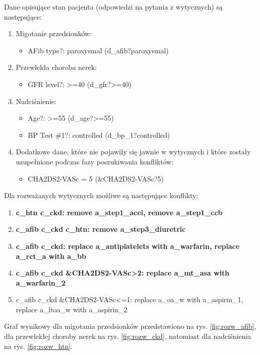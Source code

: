 Dane opisujące stan pacjenta (odpowiedzi na pytania z wytycznych) są następujące:
\begin{enumerate}
\item{Migotanie przedsionków:
	\begin{itemize}
	\item{AFib type?: paroxysmal (d\_afib?paroxysmal)}
	\end{itemize}
}
\item{Przewlekła choroba nerek:
	\begin{itemize}
	\item{GFR level?: >=40 (d\_gfr?>=40)}
	\end{itemize}
}
\item{Nadciśnienie:
	\begin{itemize}
	\item{Age?: >=55 (d\_age?>=55)}
	\item{BP Test \#1?: controlled (d\_bp\_1?controlled)}
	\end{itemize}
}
\item Dodatkowe dane, które nie pojawiły się jawnie w wytycznych i które zostały uzupełnione podczas fazy poszukiwania konfliktów:
	\begin{itemize}
	\item{CHA2DS2-VASc = 5 (\&CHA2DS2-VASc?5)}
	\end{itemize}
\end{enumerate}

Dla rozważanych wytycznych możliwe są następujące konflikty:
\begin{enumerate}
\item \textbf{c\_htn c\_ckd: remove a\_step1\_acei, remove a\_step1\_ccb}
\item \textbf{c\_afib c\_ckd c\_htn: remove a\_step3\_diuretric}
\item \textbf{c\_afib c\_ckd: replace a\_antiplatelets with a\_warfarin, replace a\_rct\_a with a\_bb}
\item \textbf{c\_afib c\_ckd \&CHA2DS2-VASc>2: replace a\_mt\_asa with a\_warfarin\_2}
\item c\_afib c\_ckd \&CHA2DS2-VASc<=1: replace a\_oa\_w with a\_aspirin\_1, replace a\_ltoa\_w with a\_aspirin\_2
\end{enumerate}

Graf wynikowy dla migotania przedsionków przedstawiono na rys. \ref{fig:rozw_afib}, dla przewlekłej choroby nerek na rys. \ref{fig:rozw_ckd}, natomiast dla nadciśnienia na rys. \ref{fig:rozw_htn}.


